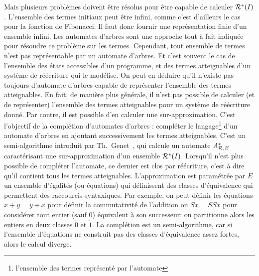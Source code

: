 Mais plusieurs problèmes doivent être résolus pour être capable de
calculer $\mathcal R^*(I)$.  L'ensemble des termes initiaux peut être infini,
comme c'est d'ailleurs le cas pour la fonction de Fibonacci.  Il faut
donc fournir une représentation finie d'un ensemble infini.  Les
automates d'arbres sont une approche tout à fait indiquée pour
résoudre ce problème sur les termes.  Cependant, tout ensemble de
termes n'est pas représentable par un automate d'arbres.  Et c'est
souvent le cas de l'ensemble des états accessibles d'un programme, et
des termes atteignables d'un système de réécriture qui le
modélise. On peut en déduire qu'il n'existe pas toujours d'automate
d'arbres capable de représenter l'ensemble des termes
atteignables. En fait, de manière plus générale, il n'est pas possible
de calculer (et de représenter) l'ensemble des termes atteignables
pour un système de réécriture donné.  Par contre, il est possible d'en
calculer une sur-approximation.  C'est l'objectif de la complétion
d'automates d'arbres : compléter le langage\footnote{\footnotesize
  l'ensemble des termes représenté par l'automate} d'un automate
d'arbres en ajoutant successivement les termes atteignables.  C'est un
semi-algorithme introduit par Th.~Genet~\cite{Genet-RTA98}, qui
calcule un automate $\mathit A^*_{\mathcal R,E}$ caractérisant une sur-approximation
d'un ensemble $\mathcal R^*(I)$.  Lorsqu'il n'est plus possible de compléter
l'automate, ce dernier est clos par réécriture, c'est à dire qu'il
contient tous les termes atteignables.  L'approximation est paramétrée
par $E$ un ensemble d'égalités (ou équations) qui définissent des
classes d'équivalence qui permettent des raccourcis syntaxiques.  Par
exemple, on peut définir les équations $x + y = y + x$ pour définir la
commutativité de l'addition ou $Sx = SSx$ pour considérer tout entier
(sauf $0$) équivalent à son successeur: on partitionne alors les
entiers en deux classes $\dot{0}$ et $\dot{1}$.  La complétion est un
semi-algorithme, car si l'ensemble d'équations ne construit pas des
classes d'équivalence assez fortes, alors le calcul diverge.

